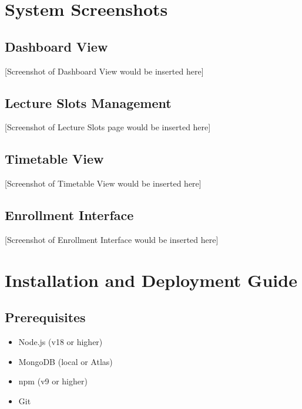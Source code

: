 \documentclass[12pt,a4paper]{report}
\begin{document}
\chapter{System Screenshots}

\section{Dashboard View}
[Screenshot of Dashboard View would be inserted here]

\section{Lecture Slots Management}
[Screenshot of Lecture Slots page would be inserted here]

\section{Timetable View}
[Screenshot of Timetable View would be inserted here]

\section{Enrollment Interface}
[Screenshot of Enrollment Interface would be inserted here]

\chapter{Installation and Deployment Guide}

\section{Prerequisites}
\begin{itemize}[leftmargin=*]
    \item Node.js (v18 or higher)
    \item MongoDB (local or Atlas)
    \item npm (v9 or higher)
    \item Git
\end{itemize}
\end{document}
